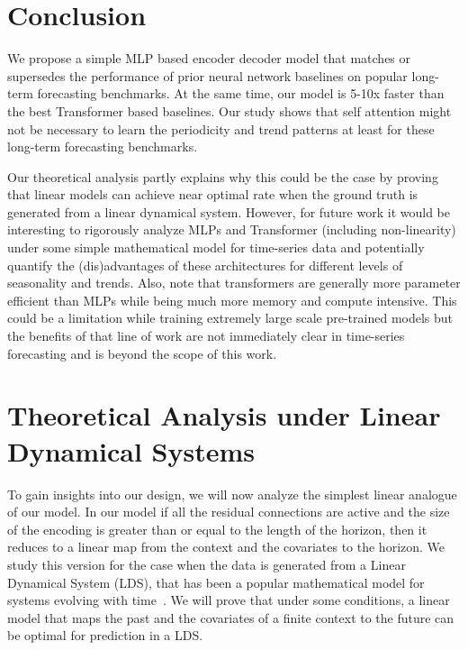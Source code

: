 \documentclass[10pt]{article} \usepackage[accepted]{tmlr}
\theoremstyle{plain}
\theoremstyle{definition}
\theoremstyle{remark}
\newcommand{\rev}[1]{#1}
\begin{document}
\section{Conclusion}
\label{sec:conclusion}
We propose a simple MLP based encoder decoder model that matches or supersedes the performance of prior neural network baselines on popular long-term forecasting benchmarks. At the same time, our model is 5-10x faster than the best Transformer based baselines. Our study shows that self attention might not be necessary to learn the periodicity and trend patterns at least for these long-term forecasting benchmarks. 

Our theoretical analysis partly explains why this could be the case by proving that linear models can achieve near optimal rate when the ground truth is generated from a linear dynamical system. However, for future work it would be interesting to rigorously analyze MLPs and Transformer \rev{(including non-linearity)} under some simple mathematical model for time-series data and potentially quantify the (dis)advantages of these architectures for different levels of seasonality and trends. \rev{Also, note that transformers are generally more parameter efficient than MLPs while being much more memory and compute intensive. This could be a limitation while training extremely large scale pre-trained models but the benefits of that line of work are not immediately clear in time-series forecasting and is beyond the scope of this work.}


\FloatBarrier



\clearpage
\appendix

\section{Theoretical Analysis under Linear Dynamical Systems}
\label{sec:theory}
To gain insights into our design, we will now analyze the simplest linear analogue of our model. In our model if all the residual connections are active and the size of the encoding is greater than or equal to the length of the horizon, then it reduces to a linear map from the context and the covariates to the horizon. We study this version for the case when the data is generated from a Linear Dynamical System (LDS), that has been a popular mathematical model for systems evolving with time~\citep{kalman1963mathematical}. We will prove that under some conditions, a linear model that maps the past and the covariates of a finite context to the future can be optimal for prediction in a LDS.
\end{document}
